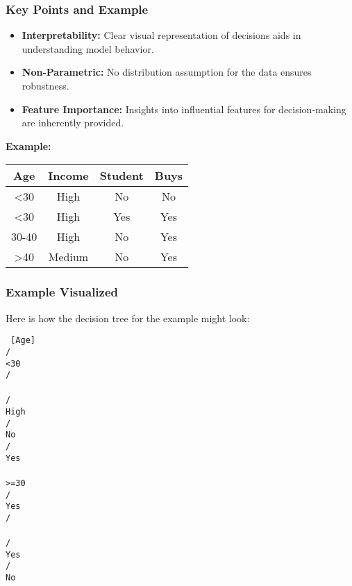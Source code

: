 \documentclass[aspectratio=169]{beamer}
\begin{document}
\begin{frame}[fragile]
    \frametitle{Key Points and Example}
    \begin{itemize}
        \item \textbf{Interpretability:} Clear visual representation of decisions aids in understanding model behavior.
        \item \textbf{Non-Parametric:} No distribution assumption for the data ensures robustness.
        \item \textbf{Feature Importance:} Insights into influential features for decision-making are inherently provided.
    \end{itemize}

    \textbf{Example:}
    \begin{table}[]
        \centering
        \begin{tabular}{|c|c|c|c|}
            \hline
            Age  & Income & Student & Buys \\ \hline
            <30  & High   & No      & No   \\ \hline
            <30  & High   & Yes     & Yes  \\ \hline
            30-40 & High   & No      & Yes  \\ \hline
            >40  & Medium & No      & Yes  \\ \hline
        \end{tabular}
    \end{table}
\end{frame}

\begin{frame}[fragile]
    \frametitle{Example Visualized}
    Here is how the decision tree for the example might look:

    \begin{center}
        \texttt{
            [Age] \\
            / \\ 
            <30 \\ 
            / \\ 
            [Income] \\ 
            / \\ 
            High \\ 
            / \\ 
            No \\ 
            / \\ 
            Yes \\
            \\
            >=30 \\ 
            / \\ 
            Yes \\ 
            / \\ 
            [Student] \\ 
            / \\ 
            Yes \\ 
            / \\ 
            No \\
        }
    \end{center}
\end{frame}
\end{document}
